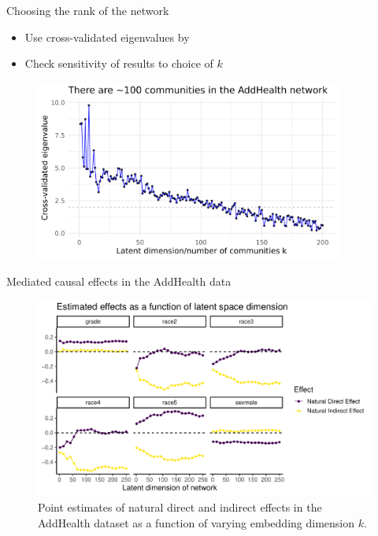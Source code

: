 \documentclass{beamer}
\theoremstyle{remark}
\begin{document}
\begin{frame}{Choosing the rank of the network}

    \begin{itemize}
        \item Use cross-validated eigenvalues by \cite{chen_estimating_2021}
        \item Check sensitivity of results to choice of $k$
    \end{itemize}

    \begin{figure}
        \includegraphics[width=0.9\textwidth]{figures/presentation/rank.png}
        \label{fig:rank}
    \end{figure}
\end{frame}

\begin{frame}{Mediated causal effects in the AddHealth data}

    \begin{figure}
        \includegraphics[width=\textwidth]{figures/addhealth-effects.pdf}
        \caption{Point estimates of natural direct and indirect effects in the AddHealth dataset as a function of varying embedding dimension $k$.}
        \label{fig:addhealth-estimates}
    \end{figure}
\end{frame}
\end{document}
